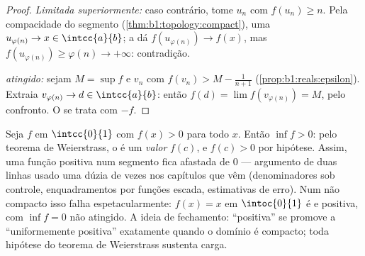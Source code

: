 \begin{proof}
\emph{Limitada superiormente:} caso contrário, tome $u_n$ com $f(u_n) \geq n$. Pela compacidade do segmento (\cref{thm:b1:topology:compact}), uma
 $u_{\varphi(n)} \to x \in \intcc{a}{b}$; a  dá
$f(u_{\varphi(n)}) \to f(x)$, mas $f(u_{\varphi(n)}) \geq \varphi(n)
\to +\infty$: contradição.

\emph{ atingido:} sejam $M = \sup f$ e $v_n$ com $f(v_n) >
M - \frac{1}{n+1}$ (\cref{prop:b1:reals:epsilon}). Extraia
$v_{\varphi(n)} \to d \in \intcc{a}{b}$: então $f(d) = \lim
f(v_{\varphi(n)}) = M$, pelo confronto. O  se trata com
$-f$.
\end{proof}

\begin{example}\label{ex:b1:continuity:posmin}
Seja $f$  em $\intcc{0}{1}$ com $f(x) > 0$ para
todo $x$. Então $\inf f > 0$: pelo teorema de Weierstrass, o
 é um \emph{valor} $f(c)$, e $f(c) > 0$ por hipótese.
Assim, uma função  positiva num segmento fica afastada de
$0$ --- argumento de duas linhas usado uma dúzia de vezes nos
capítulos que vêm (denominadores sob controle, enquadramentos por
funções escada, estimativas de erro). Num  não compacto isso
falha espetacularmente: $f(x) = x$ em $\intoc{0}{1}$ é  e
positiva, com $\inf f = 0$ não atingido. A ideia de fechamento:
``positiva'' se promove a ``uniformemente positiva'' exatamente quando
o domínio é compacto; toda hipótese do teorema de Weierstrass sustenta
carga.
\end{example}

